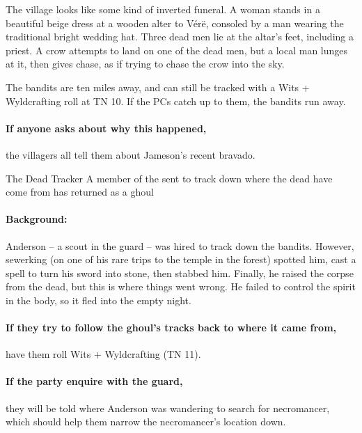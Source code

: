\begin{multicols}{2}
\begin{boxtext}

  The village looks like some kind of inverted funeral.
  A woman stands in a beautiful beige dress at a wooden alter to V\'{e}r\"{e}, consoled by a man wearing the traditional bright wedding hat.
  Three dead men lie at the altar's feet, including a priest.
  A crow attempts to land on one of the dead men, but a local man lunges at it, then gives chase, as if trying to chase the crow into the sky.

\end{boxtext}

The bandits are ten miles away, and can still be tracked with a Wits + Wyldcrafting roll at TN 10.
If the PCs catch up to them, the bandits run away.

\paragraph{If anyone asks about why this happened,}
the villagers all tell them about Jameson's recent bravado.

{The Dead Tracker}%
{A member of the  sent to track down where the dead have come from has returned as a ghoul}%

\paragraph{Background:}
Anderson -- a scout in the \gls{guard} -- was hired to track down the bandits.
However, \gls{sewerking} (on one of his rare trips to the temple in the forest) spotted him, cast a spell to turn his sword into stone, then stabbed him. 
Finally, he raised the corpse from the dead, but this is where things went wrong.
He failed to control the spirit in the body, so it fled into the empty night.


\paragraph{If they try to follow the ghoul's tracks back to where it came from,}
have them roll Wits + Wyldcrafting (TN 11).

\paragraph{If the party enquire with the \gls{guard},}
they will be told where Anderson was wandering to search for \gls{necromancer}, which should help them narrow the necromancer's location down.


\end{multicols}
